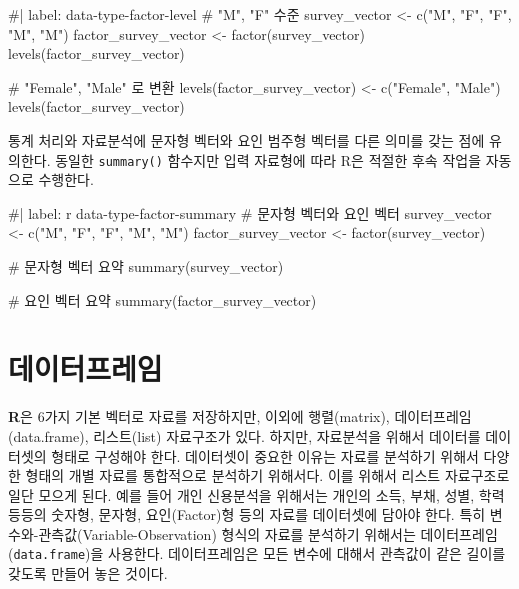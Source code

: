 \documentclass[
  letterpaper,
]{book}
\newenvironment{Shaded}{\begin{snugshade}}{\end{snugshade}}
\newcommand{\NormalTok}[1]{\textcolor[rgb]{0.00,0.23,0.31}{#1}}
\begin{document}
\begin{Shaded}
\begin{Highlighting}[]
\NormalTok{\#| label: data{-}type{-}factor{-}level}
\NormalTok{\# "M", "F" 수준}
\NormalTok{survey\_vector \textless{}{-} c("M", "F", "F", "M", "M")}
\NormalTok{factor\_survey\_vector \textless{}{-} factor(survey\_vector)}
\NormalTok{levels(factor\_survey\_vector)}

\NormalTok{\# "Female", "Male" 로 변환}
\NormalTok{levels(factor\_survey\_vector) \textless{}{-} c("Female", "Male")}
\NormalTok{levels(factor\_survey\_vector)}
\end{Highlighting}
\end{Shaded}

통계 처리와 자료분석에 문자형 벡터와 요인 범주형 벡터를 다른 의미를 갖는
점에 유의한다. 동일한 \texttt{summary()} 함수지만 입력 자료형에 따라 R은
적절한 후속 작업을 자동으로 수행한다.

\begin{Shaded}
\begin{Highlighting}[]
\NormalTok{\#| label: r data{-}type{-}factor{-}summary}
\NormalTok{\# 문자형 벡터와 요인 벡터}
\NormalTok{survey\_vector \textless{}{-} c("M", "F", "F", "M", "M")}
\NormalTok{factor\_survey\_vector \textless{}{-} factor(survey\_vector)}

\NormalTok{\# 문자형 벡터 요약}
\NormalTok{summary(survey\_vector)}

\NormalTok{\# 요인 벡터 요약}
\NormalTok{summary(factor\_survey\_vector)}
\end{Highlighting}
\end{Shaded}

\section{데이터프레임}\label{data-type-dataframe-in-r}

\textbf{R}은 6가지 기본 벡터로 자료를 저장하지만, 이외에 행렬(matrix),
데이터프레임(data.frame), 리스트(list) 자료구조가 있다. 하지만,
자료분석을 위해서 데이터를 데이터셋의 형태로 구성해야 한다. 데이터셋이
중요한 이유는 자료를 분석하기 위해서 다양한 형태의 개별 자료를
통합적으로 분석하기 위해서다. 이를 위해서 리스트 자료구조로 일단 모으게
된다. 예를 들어 개인 신용분석을 위해서는 개인의 소득, 부채, 성별, 학력
등등의 숫자형, 문자형, 요인(Factor)형 등의 자료를 데이터셋에 담아야
한다. 특히 변수와-관측값(Variable-Observation) 형식의 자료를 분석하기
위해서는 데이터프레임(\texttt{data.frame})을 사용한다. 데이터프레임은
모든 변수에 대해서 관측값이 같은 길이를 갖도록 만들어 놓은 것이다.
 
\end{document}
